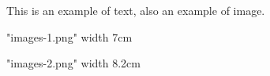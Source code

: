 \pdfpagewidth=105mm
\pdfpageheight=148.5mm

\hsize=79mm
\vsize=115mm

\hoffset=-12.4mm
\voffset=-12.4mm

This is an example of text, also an example of image.

\bigskip
\centerline{{\XeTeXpicfile "images-1.png" width 7cm}}

\vfill\eject\bigskip

\centerline{{\XeTeXpicfile "images-2.png" width 8.2cm}}

\bye
